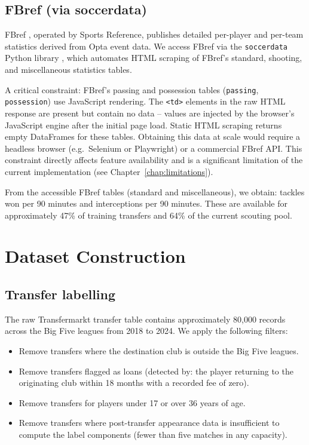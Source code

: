 \documentclass[12pt, a4paper, oneside]{report}
\begin{document}
\subsection{FBref (via soccerdata)}

FBref \citep{fbref2023}, operated by Sports Reference, publishes detailed per-player and per-team statistics derived from Opta event data. We access FBref via the \texttt{soccerdata} Python library \citep{soccerdata2023}, which automates HTML scraping of FBref's standard, shooting, and miscellaneous statistics tables.

A critical constraint: FBref's passing and possession tables (\texttt{passing}, \texttt{possession}) use JavaScript rendering. The \texttt{<td>} elements in the raw HTML response are present but contain no data -- values are injected by the browser's JavaScript engine after the initial page load. Static HTML scraping returns empty DataFrames for these tables. Obtaining this data at scale would require a headless browser (e.g.\ Selenium or Playwright) or a commercial FBref API. This constraint directly affects feature availability and is a significant limitation of the current implementation (see Chapter~\ref{chap:limitations}).

From the accessible FBref tables (standard and miscellaneous), we obtain: tackles won per 90 minutes and interceptions per 90 minutes. These are available for approximately 47\% of training transfers and 64\% of the current scouting pool.

\section{Dataset Construction}

\subsection{Transfer labelling}

The raw Transfermarkt transfer table contains approximately 80,000 records across the Big Five leagues from 2018 to 2024. We apply the following filters:

\begin{itemize}[leftmargin=2em]
    \item Remove transfers where the destination club is outside the Big Five leagues.
    \item Remove transfers flagged as loans (detected by: the player returning to the originating club within 18 months with a recorded fee of zero).
    \item Remove transfers for players under 17 or over 36 years of age.
    \item Remove transfers where post-transfer appearance data is insufficient to compute the label components (fewer than five matches in any capacity).
\end{itemize}
\end{document}
